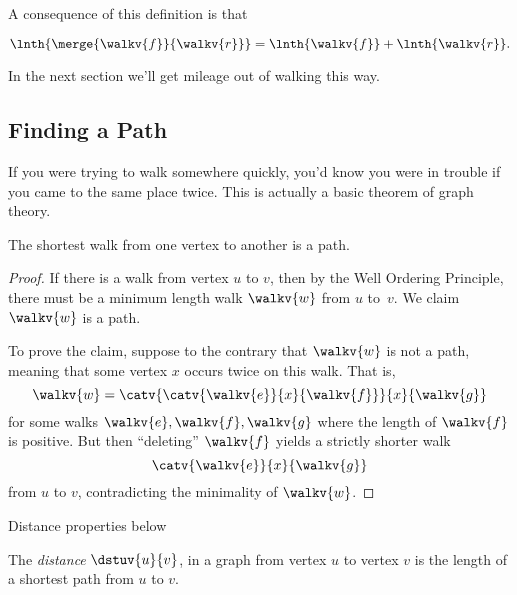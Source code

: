 A consequence of this definition is that
\begin{lemma}\label{sumoflengths}
\[
\lnth{\merge{\walkv{f}}{\walkv{r}}} = \lnth{\walkv{f}} + \lnth{\walkv{r}}.
\]
\end{lemma}
In the next section we'll get mileage out of walking this way.

\subsection{Finding a Path}
If you were trying to walk somewhere quickly, you'd know you were in
trouble if you came to the same place twice.  This is actually a basic
theorem of graph theory.

\begin{theorem}\label{shortestwalk_thm}
The shortest walk from one vertex to another is a path.
\end{theorem}

\begin{proof}
  If there is a walk from vertex $u$ to $v$, then by the Well Ordering
  Principle, there must be a minimum length walk $\walkv{w}$ from $u$
  to~$v$.  We claim $\walkv{w}$ is a path.

  To prove the claim, suppose to the contrary that $\walkv{w}$ is not a
  path, meaning that some vertex $x$ occurs twice on this walk.  That is,
\[
\walkv{w} = \catv{\catv{\walkv{e}}{x}{\walkv{f}}}{x}{\walkv{g}}
\]
for some walks $\walkv{e}, \walkv{f}, \walkv{g}$ where the length of
$\walkv{f}$ is positive.  But then ``deleting'' $\walkv{f}$ yields a
strictly shorter walk
\[
\catv{\walkv{e}}{x}{\walkv{g}}
\]
from $u$ to $v$, contradicting the minimality of $\walkv{w}$.
\end{proof}

\iffalse

Actually, we proved something stronger:
\begin{corollary}\label{pathlewalk_cor}
For any walk in a digraph, there is a path starting and ending at the
same vertices as the walk and containing only edges in the walk.  Such
a path is necessarily no longer than the walk.
\end{corollary}
\fi

\begin{editingnotes}
Distance properties below 
\end{editingnotes}

\begin{definition}
  The  \emph{distance}
  $\dstuv{u}{v}$, in a graph from vertex $u$ to vertex $v$ is the
  length of a shortest path from $u$ to $v$.
\end{definition}

